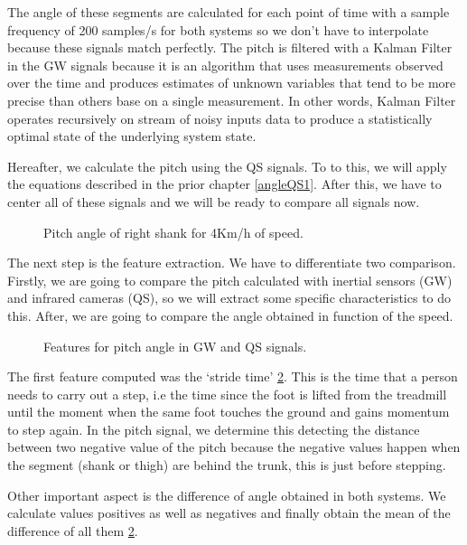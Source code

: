 The angle of these segments are calculated for each point of time with a sample frequency of 200 samples/s for both systems so we don’t have to interpolate because these signals match perfectly. The pitch is filtered with a Kalman Filter in the GW signals because it is an algorithm that uses measurements observed over the time and produces estimates of unknown variables that tend to be more precise than others base on a single measurement. In other words, Kalman Filter operates recursively on stream of noisy inputs data to produce a statistically optimal state of the underlying system state\cite{Kalman Filter}.

Hereafter, we calculate the pitch using the QS signals. To to this, we will apply the equations described in the prior chapter \ref{angleQS1}.
After this, we have to center all of these signals and we will be ready to compare all signals now.

\begin{figure}[H]
	\centering
	\caption{Pitch angle of right shank for 4Km/h of speed.}
	\label{fig:signalGWQS}
\end{figure}

The next step is the feature extraction. We have to differentiate two comparison. Firstly, we are going to compare the pitch calculated with inertial sensors (GW) and infrared cameras (QS), so we will extract some specific characteristics to do this. After, we are going to compare the angle obtained in function of the speed.
\begin{figure}[H]
	\centering
	\caption{Features for pitch angle in GW and QS signals.}
	\label{fig:featuresGWQS}
\end{figure}
The first feature computed was the ‘stride time’ \ref{fig:featuresGWQS}. This is the time that a person needs to carry out a step, i.e the time since the foot is lifted from the treadmill until the moment when the same foot touches the ground and gains momentum to step again. In the pitch signal, we determine this detecting the distance between two negative value of the pitch because the negative values happen when the segment (shank or thigh) are behind the trunk, this is just before stepping.

Other important aspect is the difference of angle obtained in both systems. We calculate values positives as well as negatives and finally obtain the mean of the difference of all them \ref{fig:featuresGWQS}.


